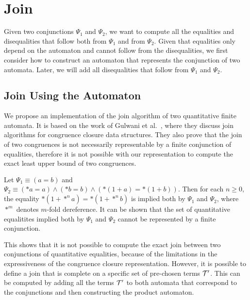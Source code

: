 
\section{Join}

Given two conjunctions $\Psi_1$ and $\Psi_2$, we want to compute all the equalities and disequalities that follow both from $\Psi_1$ and from $\Psi_2$.
Given that equalities only depend on the automaton and cannot follow from the disequalities, we first consider how to construct an automaton that represents the conjunction of two automata.
Later, we will add all disequalities that follow from $\Psi_1$ and $\Psi_2$.

\subsection{Join Using the Automaton}

We propose an implementation of the join algorithm of two quantitative finite automata.
It is based on the work of Gulwani et al.~\cite{join}, where they discuss join algorithms for congruence closure data structures.
They also prove that the join of two congruences is not necessarily representable by a finite conjunction of equalities, therefore it is not possible with our representation to compute the exact least upper bound of two congruences.

\begin{example}\label{example:infinite-join}
    Let $\Psi_1 \equiv (a = b)$ and $\Psi_2 \equiv (*a = a)\land (*b=b) \land (*(1 + a) = *(1 + b))$. Then for each $n \geq 0$, the equality $*(1+*^n a) = *(1 + *^n b)$ is implied both by $\Psi_1$ and $\Psi_2$, where $*^m$ denotes $m$-fold dereference.
    It can be shown that the set of quantitative equalitites implied both by $\Psi_1$ and $\Psi_2$ cannot be represented by a finite conjunction\cite{join, 2pointer}.
\end{example}

This shows that it is not possible to compute the exact join between two conjunctions of quantitative equalities, because of the limitations in the expressiveness of the congruence closure representation.
However, it is possible to define a join that is complete on  a specific set of pre-chosen terms $\mathcal{T}'$.
This can be computed by adding all the terms $\mathcal{T}'$ to both automata that correspond to the conjunctions and then constructing the product automaton.

